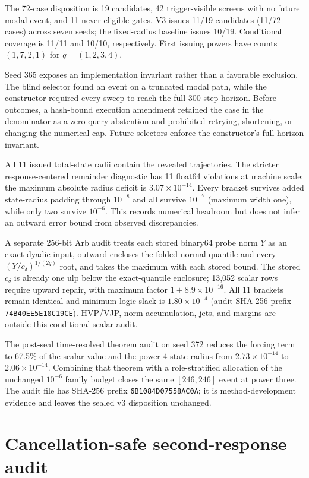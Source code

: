 \documentclass{article}
\begin{document}
The 72-case disposition is 19 candidates, 42 trigger-visible screens with no
future modal event, and 11 never-eligible gates.  V3 issues 11/19 candidates
(11/72 cases) across seven seeds; the fixed-radius baseline issues 10/19.
Conditional coverage is 11/11 and 10/10, respectively.  First issuing powers
have counts $(1,7,2,1)$ for $q=(1,2,3,4)$.

Seed 365 exposes an implementation invariant rather than a favorable
exclusion.  The blind selector found an event on a truncated modal path, while
the constructor required every sweep to reach the full 300-step horizon.
Before outcomes, a hash-bound execution amendment retained the case in the
denominator as a zero-query abstention and prohibited retrying, shortening, or
changing the numerical cap.  Future selectors enforce the constructor's full
horizon invariant.

All 11 issued total-state radii contain the revealed trajectories.  The
stricter response-centered remainder diagnostic has 11 float64 violations at
machine scale; the maximum absolute radius deficit is
$3.07\times10^{-14}$.  Every bracket survives added state-radius padding
through $10^{-8}$ and all survive $10^{-7}$ (maximum width one), while only
two survive $10^{-6}$.  This records numerical headroom but does not infer an
outward error bound from observed discrepancies.

A separate 256-bit Arb audit treats each stored binary64 probe norm $Y$ as an
exact dyadic input, outward-encloses the folded-normal quantile and every
$(Y/c_\delta)^{1/(2q)}$ root, and takes the maximum with each stored bound.
The stored $c_\delta$ is already one ulp below the exact-quantile enclosure;
13,052 scalar rows require upward repair, with maximum factor
$1+8.9\times10^{-16}$.  All 11 brackets remain identical and minimum logic
slack is $1.80\times10^{-4}$ (audit SHA-256 prefix
\texttt{74B40EE5E10C19CE}).  HVP/VJP, norm accumulation, jets, and margins are
outside this conditional scalar audit.

The post-seal time-resolved theorem audit on seed 372 reduces the forcing term
to 67.5\% of the scalar value and the power-4 state radius from
$2.73\times10^{-14}$ to $2.06\times10^{-14}$.  Combining that theorem with a
role-stratified allocation of the unchanged $10^{-6}$ family budget closes the
same $[246,246]$ event at power three.  The audit file has SHA-256 prefix
\texttt{6B1084D07558AC0A}; it is method-development evidence and leaves the
sealed v3 disposition unchanged.

\section{Cancellation-safe second-response audit}
\label{app:two-response-audit}
\end{document}
